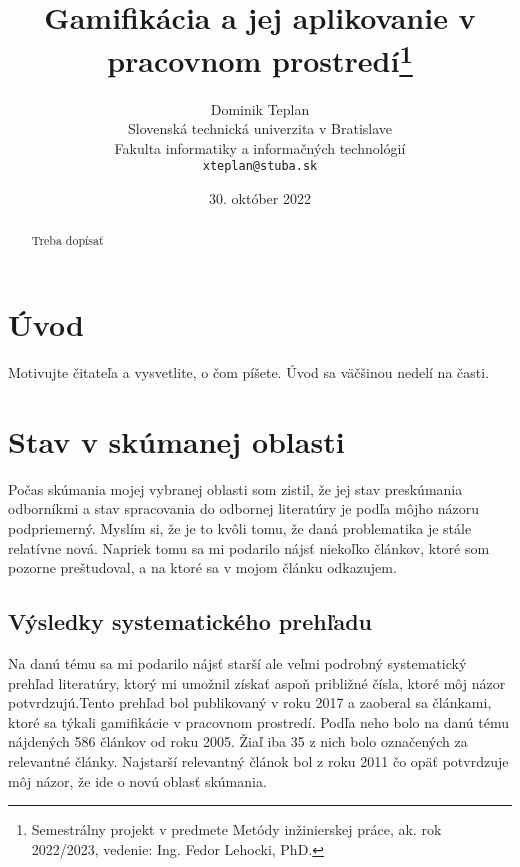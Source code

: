 \documentclass{article}
\title{Gamifikácia a jej aplikovanie v pracovnom prostredí\thanks{Semestrálny projekt v predmete Metódy inžinierskej práce, ak. rok 2022/2023, vedenie: Ing. Fedor Lehocki, PhD.}} %
\author{Dominik Teplan\\[2pt]
	{\small Slovenská technická univerzita v Bratislave}\\
	{\small Fakulta informatiky a informačných technológií}\\
	{\small \texttt{xteplan@stuba.sk}}
	}
\date{\small 30. október 2022} %
\begin{document}
\maketitle

\begin{abstract}
Treba dopísať
\end{abstract}



\section{Úvod}

Motivujte čitateľa a vysvetlite, o čom píšete. Úvod sa väčšinou nedelí na časti.


\section{Stav v skúmanej oblasti} \label{stav}

Počas skúmania mojej vybranej oblasti som zistil, že jej stav preskúmania odborníkmi a stav spracovania do odbornej literatúry je podľa môjho názoru podpriemerný. Myslím si, že je to kvôli tomu, že daná problematika je stále relatívne nová. Napriek tomu sa mi podarilo nájsť niekoľko článkov, ktoré som pozorne preštudoval, a na ktoré sa v mojom článku odkazujem. 

\subsection{Výsledky systematického prehľadu} 
Na danú tému sa mi podarilo nájsť starší ale veľmi podrobný systematický prehľad literatúry, ktorý mi umožnil získať aspoň približné čísla, ktoré môj názor potvrdzujú\cite{10.1007/978-3-319-56541-5_29}.Tento prehľad bol publikovaný v roku 2017 a zaoberal sa článkami, ktoré sa týkali gamifikácie v pracovnom prostredí. Podľa neho bolo na danú tému nájdených 586 článkov od roku 2005. Žiaľ iba 35 z nich bolo označených za relevantné články. Najstarší relevantný článok bol z roku 2011 čo opäť potvrdzuje môj názor, že ide o novú oblasť skúmania.
\end{document}
